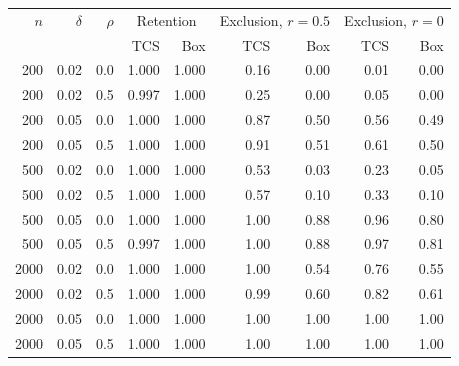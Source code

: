 \begin{tabular}{rrrrrrrrr}\toprule
$n$ & $\delta$ & $\rho$ & \multicolumn{2}{c}{Retention} & \multicolumn{2}{c}{Exclusion, $r=0.5$} & \multicolumn{2}{c}{Exclusion, $r=0$} \\
 & & & TCS & Box & TCS & Box & TCS & Box \\\midrule
200 & 0.02 & 0.0 & 1.000 & 1.000 & 0.16 & 0.00 & 0.01 & 0.00 \\
200 & 0.02 & 0.5 & 0.997 & 1.000 & 0.25 & 0.00 & 0.05 & 0.00 \\
200 & 0.05 & 0.0 & 1.000 & 1.000 & 0.87 & 0.50 & 0.56 & 0.49 \\
200 & 0.05 & 0.5 & 1.000 & 1.000 & 0.91 & 0.51 & 0.61 & 0.50 \\
500 & 0.02 & 0.0 & 1.000 & 1.000 & 0.53 & 0.03 & 0.23 & 0.05 \\
500 & 0.02 & 0.5 & 1.000 & 1.000 & 0.57 & 0.10 & 0.33 & 0.10 \\
500 & 0.05 & 0.0 & 1.000 & 1.000 & 1.00 & 0.88 & 0.96 & 0.80 \\
500 & 0.05 & 0.5 & 0.997 & 1.000 & 1.00 & 0.88 & 0.97 & 0.81 \\
2000 & 0.02 & 0.0 & 1.000 & 1.000 & 1.00 & 0.54 & 0.76 & 0.55 \\
2000 & 0.02 & 0.5 & 1.000 & 1.000 & 0.99 & 0.60 & 0.82 & 0.61 \\
2000 & 0.05 & 0.0 & 1.000 & 1.000 & 1.00 & 1.00 & 1.00 & 1.00 \\
2000 & 0.05 & 0.5 & 1.000 & 1.000 & 1.00 & 1.00 & 1.00 & 1.00 \\
\bottomrule\end{tabular}